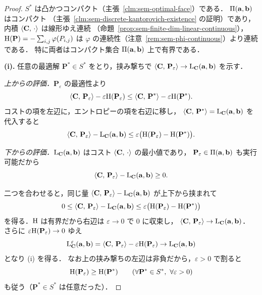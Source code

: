 \begin{proof}
  $S^*$ は凸かつコンパクト（主張~\ref{clm:sem-optimal-face}）である．
  $\Pi(\mathbf{a},\mathbf{b})$ はコンパクト
  （主張~\ref{clm:sem-discrete-kantorovich-existence} の証明）であり，
  内積 $\langle \mathbf{C},\, \cdot \rangle$ は線形ゆえ連続
  （命題~\ref{prop:sem-finite-dim-linear-continuous}），
  $\mathrm{H}(\mathbf{P}) = -\sum_{i,j}\varphi(P_{i,j})$ は
  $\varphi$ の連続性（注意~\ref{rem:sem-phi-continuous}）より連続である．
  特に両者はコンパクト集合 $\Pi(\mathbf{a},\mathbf{b})$ 上で有界である．

  \textbf{(i).}
  任意の最適解 $\mathbf{P}^* \in S^*$ をとり，挟み撃ちで
  $\langle \mathbf{C},\, \mathbf{P}_\varepsilon \rangle \to \mathrm{L}_{\mathbf{C}}(\mathbf{a},\mathbf{b})$ を示す．

  \emph{上からの評価．}$\mathbf{P}_\varepsilon$ の最適性より
  \[
    \langle \mathbf{C},\, \mathbf{P}_\varepsilon \rangle - \varepsilon\mathrm{H}(\mathbf{P}_\varepsilon)
    \leq
    \langle \mathbf{C},\, \mathbf{P}^* \rangle - \varepsilon\mathrm{H}(\mathbf{P}^*).
  \]
  コストの項を左辺に，エントロピーの項を右辺に移し，
  $\langle \mathbf{C},\, \mathbf{P}^* \rangle = \mathrm{L}_{\mathbf{C}}(\mathbf{a},\mathbf{b})$ を代入すると
  \[
    \langle \mathbf{C},\, \mathbf{P}_\varepsilon \rangle - \mathrm{L}_{\mathbf{C}}(\mathbf{a},\mathbf{b})
    \leq
    \varepsilon\bigl(\mathrm{H}(\mathbf{P}_\varepsilon) - \mathrm{H}(\mathbf{P}^*)\bigr).
  \]

  \emph{下からの評価．}$\mathrm{L}_{\mathbf{C}}(\mathbf{a},\mathbf{b})$ はコスト $\langle \mathbf{C},\, \cdot \rangle$ の最小値であり，
  $\mathbf{P}_\varepsilon \in \Pi(\mathbf{a},\mathbf{b})$ も実行可能だから
  \[
    \langle \mathbf{C},\, \mathbf{P}_\varepsilon \rangle - \mathrm{L}_{\mathbf{C}}(\mathbf{a},\mathbf{b}) \geq 0 .
  \]

  二つを合わせると，同じ量
  $\langle \mathbf{C},\, \mathbf{P}_\varepsilon \rangle - \mathrm{L}_{\mathbf{C}}(\mathbf{a},\mathbf{b})$
  が上下から挟まれて
  \[
    0
    \leq
    \langle \mathbf{C},\, \mathbf{P}_\varepsilon \rangle - \mathrm{L}_{\mathbf{C}}(\mathbf{a},\mathbf{b})
    \leq
    \varepsilon\bigl(\mathrm{H}(\mathbf{P}_\varepsilon) - \mathrm{H}(\mathbf{P}^*)\bigr)
  \]
  を得る．$\mathrm{H}$ は有界だから右辺は $\varepsilon \to 0$ で $0$ に収束し，
  $\langle \mathbf{C},\, \mathbf{P}_\varepsilon \rangle \to \mathrm{L}_{\mathbf{C}}(\mathbf{a},\mathbf{b})$．
  さらに $\varepsilon\mathrm{H}(\mathbf{P}_\varepsilon) \to 0$ ゆえ
  \[
    \mathrm{L}_{\mathbf{C}}^\varepsilon(\mathbf{a},\mathbf{b})
    = \langle \mathbf{C},\, \mathbf{P}_\varepsilon \rangle - \varepsilon\mathrm{H}(\mathbf{P}_\varepsilon)
    \to \mathrm{L}_{\mathbf{C}}(\mathbf{a},\mathbf{b})
  \]
  となり (i) を得る．
  なお上の挟み撃ちの左辺は非負だから，$\varepsilon > 0$ で割ると
  \[
    \mathrm{H}(\mathbf{P}_\varepsilon) \geq \mathrm{H}(\mathbf{P}^*)
    \qquad (\forall \mathbf{P}^* \in S^*,\ \forall \varepsilon > 0)
  \]
  も従う（$\mathbf{P}^* \in S^*$ は任意だった）．


\end{proof}
